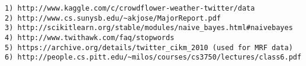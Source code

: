 \begin{verbatim}
1) http://www.kaggle.com/c/crowdflower-weather-twitter/data
2) http://www.cs.sunysb.edu/~akjose/MajorReport.pdf
3) http://scikit­learn.org/stable/modules/naive_bayes.html#naive­bayes
4) http://www.twithawk.com/faq/stopwords
5) https://archive.org/details/twitter_cikm_2010 (used for MRF data)
6) http://people.cs.pitt.edu/~milos/courses/cs3750/lectures/class6.pdf
\end{verbatim}
